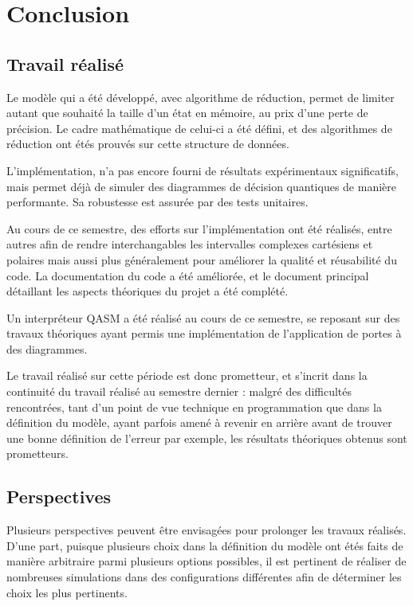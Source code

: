
\chapter{Conclusion} %
\label{ch:Conclusion}

\section{Travail réalisé}

Le modèle qui a été développé, avec algorithme de réduction, permet de limiter autant que souhaité la taille d'un état en mémoire, au prix d'une perte de précision. Le cadre mathématique de celui-ci a été défini, et des algorithmes de réduction ont étés prouvés sur cette structure de données.

L'implémentation, n'a pas encore fourni de résultats expérimentaux significatifs, mais permet déjà de simuler des diagrammes de décision quantiques de manière performante. Sa robustesse est assurée par des tests unitaires.

Au cours de ce semestre, des efforts sur l'implémentation ont été réalisés, entre autres afin de rendre interchangables les intervalles complexes cartésiens et polaires mais aussi plus généralement pour améliorer la qualité et réusabilité du code. La documentation du code a été améliorée, et le document principal détaillant les aspects théoriques du projet a été complété.

Un interpréteur QASM a été réalisé au cours de ce semestre, se reposant sur des travaux théoriques ayant permis une implémentation de l'application de portes à des diagrammes.

Le travail réalisé sur cette période est donc prometteur, et s'incrit dans la continuité du travail réalisé au semestre dernier : malgré des difficultés rencontrées, tant d'un point de vue technique en programmation que dans la définition du modèle, ayant parfois amené à revenir en arrière avant de trouver une bonne définition de l'erreur par exemple, les résultats théoriques obtenus sont prometteurs.

\section{Perspectives}

Plusieurs perspectives peuvent être envisagées pour prolonger les travaux réalisés. D'une part, puisque plusieurs choix dans la définition du modèle ont étés faits de manière arbitraire parmi plusieurs options possibles, il est pertinent de réaliser de nombreuses simulations dans des configurations différentes afin de déterminer les choix les plus pertinents.

